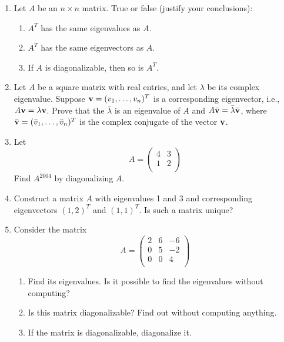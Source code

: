 \documentclass[../psets.tex]{subfiles}
\begin{document}
\begin{enumerate}[label={\textbf{2.\arabic*.}}]
    \item Let $A$ be an $n\times n$ matrix. True or false (justify your conclusions):
    \begin{enumerate}
        \item $A^T$ has the same eigenvalues as $A$.
        \item $A^T$ has the same eigenvectors as $A$.
        \item If $A$ is diagonalizable, then so is $A^T$.
    \end{enumerate}
    \item Let $A$ be a square matrix with real entries, and let $\lambda$ be its complex eigenvalue. Suppose $\mathbf{v}=(v_1,\dots,v_n)^T$ is a corresponding eigenvector, i.e., $A\mathbf{v}=\lambda\mathbf{v}$. Prove that the $\bar{\lambda}$ is an eigenvalue of $A$ and $A\bar{\mathbf{v}}=\bar{\lambda}\bar{\mathbf{v}}$, where $\bar{\mathbf{v}}=(\bar{v}_1,\dots,\bar{v}_n)^T$ is the complex conjugate of the vector $\mathbf{v}$.
    \item Let
    \begin{equation*}
        A =
        \begin{pmatrix}
            4 & 3\\
            1 & 2\\
        \end{pmatrix}
    \end{equation*}
    Find $A^{2004}$ by diagonalizing $A$.
    \item Construct a matrix $A$ with eigenvalues 1 and 3 and corresponding eigenvectors $(1,2)^T$ and $(1,1)^T$. Is such a matrix unique?
    \item Consider the matrix
    \begin{equation*}
        A =
        \begin{pmatrix}
            2 & 6 & -6\\
            0 & 5 & -2\\
            0 & 0 & 4\\
        \end{pmatrix}
    \end{equation*}
    \begin{enumerate}
        \item Find its eigenvalues. Is it possible to find the eigenvalues without computing?
        \item Is this matrix diagonalizable? Find out without computing anything.
        \item If the matrix is diagonalizable, diagonalize it.

\end{enumerate}
\end{enumerate}
\end{document}
